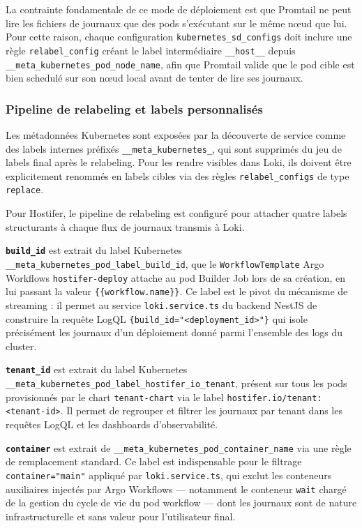 La contrainte fondamentale de ce mode de déploiement est que Promtail ne peut lire les fichiers de journaux que des pods s'exécutant sur le même nœud que lui. Pour cette raison, chaque configuration \texttt{kubernetes\_sd\_configs} doit inclure une règle \texttt{relabel\_config} créant le label intermédiaire \texttt{\_\_host\_\_} depuis \texttt{\_\_meta\_kubernetes\_pod\_node\_name}, afin que Promtail valide que le pod cible est bien schedulé sur son nœud local avant de tenter de lire ses journaux. 

\subsubsection*{Pipeline de relabeling et labels personnalisés}

Les métadonnées Kubernetes sont exposées par la découverte de service comme des labels internes préfixés \texttt{\_\_meta\_kubernetes\_}, qui sont supprimés du jeu de labels final après le relabeling. Pour les rendre visibles dans Loki, ils doivent être explicitement renommés en labels cibles via des règles \texttt{relabel\_configs} de type \texttt{replace}. 

Pour Hostifer, le pipeline de relabeling est configuré pour attacher quatre labels structurants à chaque flux de journaux transmis à Loki.

\textbf{\texttt{build\_id}} est extrait du label Kubernetes \texttt{\_\_meta\_kubernetes\_pod\_label\_build\_id}, que le \texttt{WorkflowTemplate} Argo Workflows \texttt{hostifer-deploy} attache au pod Builder Job lors de sa création, en lui passant la valeur \texttt{\{\{workflow.name\}\}}. Ce label est le pivot du mécanisme de streaming : il permet au service \texttt{loki.service.ts} du backend NestJS de construire la requête LogQL \texttt{\{build\_id="<deployment\_id>"\}} qui isole précisément les journaux d'un déploiement donné parmi l'ensemble des logs du cluster.

\textbf{\texttt{tenant\_id}} est extrait du label Kubernetes \texttt{\_\_meta\_kubernetes\_pod\_label\_hostifer\_io\_tenant}, présent sur tous les pods provisionnés par le chart \texttt{tenant-chart} via le label \texttt{hostifer.io/tenant: <tenant-id>}. Il permet de regrouper et filtrer les journaux par tenant dans les requêtes LogQL et les dashboards d'observabilité.

\textbf{\texttt{container}} est extrait de \texttt{\_\_meta\_kubernetes\_pod\_container\_name} via une règle de remplacement standard. Ce label est indispensable pour le filtrage \texttt{container="main"} appliqué par \texttt{loki.service.ts}, qui exclut les conteneurs auxiliaires injectés par Argo Workflows — notamment le conteneur \texttt{wait} chargé de la gestion du cycle de vie du pod workflow — dont les journaux sont de nature infrastructurelle et sans valeur pour l'utilisateur final.

